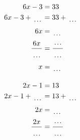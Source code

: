 \documentclass[12pt]{article}
\newcounter{minipagecount}
\begin{document}
\begin{multicols}{2}
\begin{minipage}[t]{0.45\textwidth}
    \raggedright %
    \begin{align*} %
        6x - 3 &= 33\\
        6x - 3 + \dotuline{\hspace{5mm}} &= 33 + \dotuline{\hspace{5mm}}\\
        6x &= \dotuline{\hspace{5mm}}\\
        \frac{6x}{\dotuline{\hspace{5mm}}} &= \frac{\dotuline{\hspace{5mm}}}{\dotuline{\hspace{5mm}}}\\
        x &= \dotuline{\hspace{5mm}}\\
    \end{align*}
\end{minipage} %
\noindent{(\theminipagecount)}\hspace{0.1mm} %
\begin{minipage}[t]{0.45\textwidth} %
    \vspace{-26pt}  %
    \raggedright %
    \begin{align*} %
        2x - 1 &= 13\\
        2x - 1 + \dotuline{\hspace{5mm}} &= 13 + \dotuline{\hspace{5mm}}\\
        2x &= \dotuline{\hspace{5mm}}\\
        \frac{2x}{\dotuline{\hspace{5mm}}} &= \frac{\dotuline{\hspace{5mm}}}{\dotuline{\hspace{5mm}}}\\

\end{align*}
\end{minipage}
\end{multicols}
\end{document}
